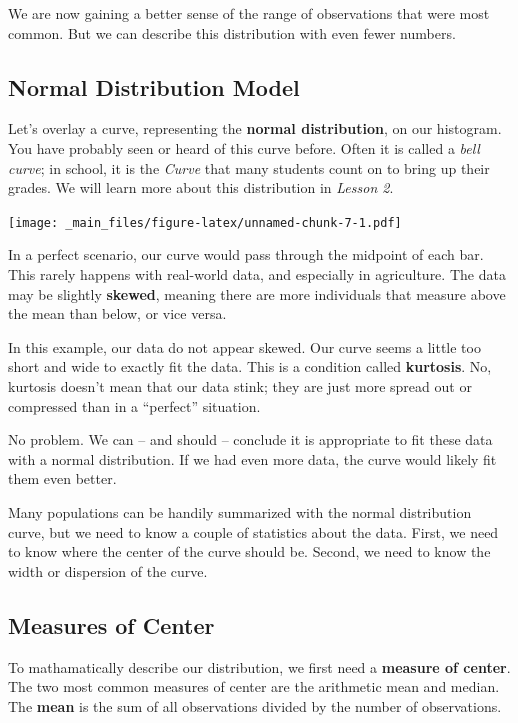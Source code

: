 \documentclass[
]{book}
\begin{document}
We are now gaining a better sense of the range of observations that were
most common. But we can describe this distribution with even fewer
numbers.

\hypertarget{normal-distribution-model}{%
\subsection{Normal Distribution Model}\label{normal-distribution-model}}

Let's overlay a curve, representing the \textbf{normal distribution}, on our
histogram. You have probably seen or heard of this curve before. Often
it is called a \emph{bell curve}; in school, it is the \emph{Curve} that many
students count on to bring up their grades. We will learn more about
this distribution in \emph{Lesson 2}.

\texttt{[image: \_main\_files/figure-latex/unnamed-chunk-7-1.pdf]}

In a perfect scenario, our curve would pass through the midpoint of each
bar. This rarely happens with real-world data, and especially in
agriculture. The data may be slightly \textbf{skewed}, meaning there are more
individuals that measure above the mean than below, or vice versa.

In this example, our data do not appear skewed. Our curve seems a little
too short and wide to exactly fit the data. This is a condition called
\textbf{kurtosis}. No, kurtosis doesn't mean that our data stink; they are
just more spread out or compressed than in a ``perfect'' situation.

No problem. We can -- and should -- conclude it is appropriate to fit
these data with a normal distribution. If we had even more data, the
curve would likely fit them even better.

Many populations can be handily summarized with the normal distribution
curve, but we need to know a couple of statistics about the data. First,
we need to know where the center of the curve should be. Second, we need
to know the width or dispersion of the curve.

\hypertarget{measures-of-center}{%
\subsection{Measures of Center}\label{measures-of-center}}

To mathamatically describe our distribution, we first need a \textbf{measure
of center}. The two most common measures of center are the arithmetic
mean and median. The \textbf{mean} is the sum of all observations divided by
the number of observations.
\end{document}

